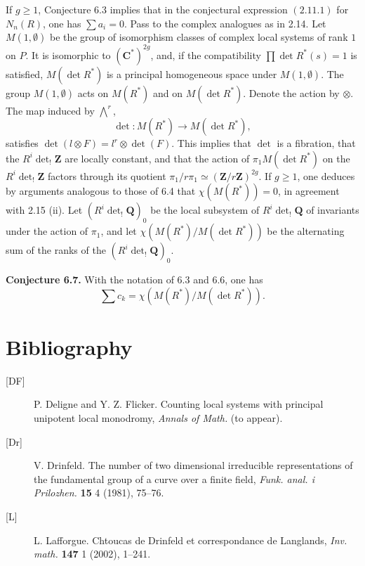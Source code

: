 \documentclass[11pt]{article}
\newcommand{\Z}{\mathbf Z}
\begin{document}
If \(g\ge 1\), Conjecture 6.3 implies that in the conjectural expression \((2.11.1)\) for \(N_n(R)\), one has \(\sum a_i=0\). Pass to the complex analogues as in 2.14. Let \(M(1,\emptyset)\) be the group of isomorphism classes of complex local systems of rank \(1\) on \(P\). It is isomorphic to \((\mathbf C^*)^{2g}\), and, if the compatibility \(\prod \det R^*(s)=1\) is satisfied, \(M(\det R^*)\) is a principal homogeneous space under \(M(1,\emptyset)\). The group \(M(1,\emptyset)\) acts on \(M(R^*)\) and on \(M(\det R^*)\). Denote the action by \(\otimes\). The map induced by \(\bigwedge^r\),
\[
\det:M(R^*)\to M(\det R^*),
\]
satisfies \(\det(l\otimes F)=l^r\otimes\det(F)\). This implies that \(\det\) is a fibration, that the \(R^i\det_!\Z\) are locally constant, and that the action of \(\pi_1M(\det R^*)\) on the \(R^i\det_!\Z\) factors through its quotient \(\pi_1/r\pi_1\simeq(\Z/r\Z)^{2g}\). If \(g\ge 1\), one deduces by arguments analogous to those of 6.4 that \(\chi(M(R^*))=0\), in agreement with 2.15 (ii). Let \((R^i\det_!\mathbf Q)_0\) be the local subsystem of \(R^i\det_!\mathbf Q\) of invariants under the action of \(\pi_1\), and let \(\chi(M(R^*)/M(\det R^*))\) be the alternating sum of the ranks of the \((R^i\det_!\mathbf Q)_0\).

\textbf{Conjecture 6.7.} With the notation of 6.3 and 6.6, one has
\[
\sum c_k=\chi(M(R^*)/M(\det R^*)).
\]

\section*{Bibliography}
\begin{description}
\item[{[DF]}] P. Deligne and Y. Z. Flicker. Counting local systems with principal unipotent local monodromy, \emph{Annals of Math.} (to appear).
\item[{[Dr]}] V. Drinfeld. The number of two dimensional irreducible representations of the fundamental group of a curve over a finite field, \emph{Funk. anal. i Prilozhen.} \textbf{15} 4 (1981), 75--76.
\item[{[L]}] L. Lafforgue. Chtoucas de Drinfeld et correspondance de Langlands, \emph{Inv. math.} \textbf{147} 1 (2002), 1--241.
\end{description}
\end{document}
